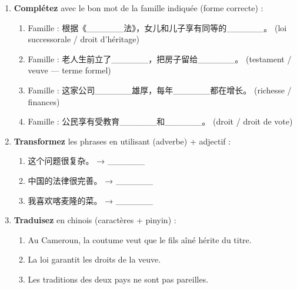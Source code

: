 \documentclass[11pt]{article}
\newcommand{\zh}[1]{\ifmmode\text{#1}\else{#1}\fi}
\begin{document}
\begin{exercice}
\begin{enumerate}
\item \textbf{Complétez} avec le bon mot de la famille indiquée (forme correcte) :
  \begin{enumerate}
  \item Famille \zh{继} : 根据《\_\_\_\_\_\_法》，女儿和儿子享有同等的\_\_\_\_\_\_。 (loi successorale / droit d'héritage)
  \item Famille \zh{遗} : 老人生前立了\_\_\_\_\_\_，把房子留给\_\_\_\_\_\_。 (testament / veuve — terme formel)
  \item Famille \zh{财} : 这家公司\_\_\_\_\_\_雄厚，每年\_\_\_\_\_\_都在增长。 (richesse / finances)
  \item Famille \zh{权} : 公民享有受教育\_\_\_\_\_\_和\_\_\_\_\_\_。 (droit / droit de vote)
  \end{enumerate}
\item \textbf{Transformez} les phrases en utilisant \zh{比较} (adverbe) + adjectif :
  \begin{enumerate}
  \item 这个问题很复杂。 → \_\_\_\_\_\_
  \item 中国的法律很完善。 → \_\_\_\_\_\_
  \item 我喜欢喀麦隆的菜。 → \_\_\_\_\_\_
  \end{enumerate}
\item \textbf{Traduisez} en chinois (caractères + pinyin) :
  \begin{enumerate}
  \item Au Cameroun, la coutume veut que le fils aîné hérite du titre.
  \item La loi garantit les droits de la veuve.
  \item Les traditions des deux pays ne sont pas pareilles.
  \end{enumerate}
\end{enumerate}
\end{exercice}
\end{document}
